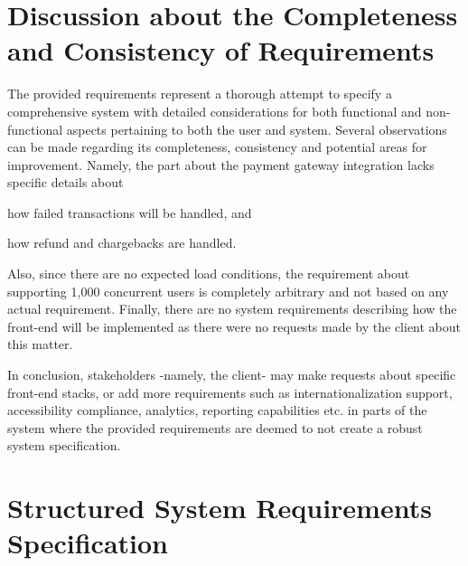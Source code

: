 \documentclass[a4paper,journal]{IEEEtran}
\begin{document}
\section{Discussion about the Completeness and Consistency of Requirements}
The provided requirements represent a thorough attempt to specify a
comprehensive system with detailed considerations for both functional and
non-functional aspects pertaining to both the user and system.
Several observations can be made regarding its completeness, consistency and
potential areas for improvement. Namely, the part about the payment gateway
integration lacks specific details about
\begin{enumerate*}
  \item how failed transactions will be handled, and
  \item how refund and chargebacks are handled.
\end{enumerate*}
Also, since there are no expected load conditions, the requirement about
supporting 1,000 concurrent users is completely arbitrary and not based on any
actual requirement.
Finally, there are no system requirements describing how the front-end will be
implemented as there were no requests made by the client about this matter.

In conclusion, stakeholders -namely, the client- may make requests about
specific front-end stacks, or add more requirements such as internationalization
support, accessibility compliance, analytics, reporting capabilities etc.
in parts of the system where the provided requirements are deemed to not create
a robust system specification.

\section{Structured System Requirements Specification}
\end{document}
